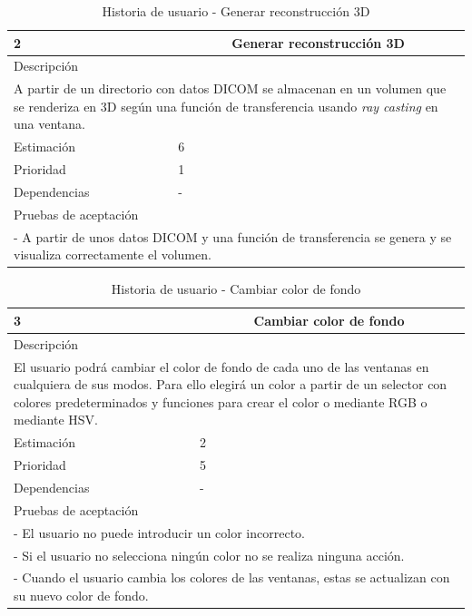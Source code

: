 \begin{table}[H]
	\begin{center}
		\begin{tabular} {|l|c|l|}
			\hline
			2 & \multicolumn{2}{c|}{Generar reconstrucción 3D} \\ \hline \hline
			\multicolumn{3}{|l|}{Descripción} \\ \hline
			\multicolumn{3}{|p{12cm}|}{A partir de un directorio con datos DICOM se almacenan en un volumen que se renderiza en 3D  según una función de transferencia usando \textit{ray casting} en una ventana.} \\ \hline
			\multicolumn{2}{|l|}{Estimación} & 6 \\ \hline
			\multicolumn{2}{|l|}{Prioridad} & 1 \\ \hline
			\multicolumn{2}{|l|}{Dependencias} & - \\ \hline
			\multicolumn{3}{|l|}{Pruebas de aceptación} \\ \hline
			\multicolumn{3}{|p{12cm}|}{ - A partir de unos datos DICOM y una función de transferencia se genera y se visualiza correctamente el volumen.} \\ \hline
		\end{tabular}
	\end{center}
	\caption{Historia de usuario - Generar reconstrucción 3D}
	\label{tab:hu_generar_reconstruccion_3d}
\end{table}

\begin{table}[H]
	\begin{center}
		\begin{tabular} {|l|c|l|}
			\hline
			3 & \multicolumn{2}{c|}{Cambiar color de fondo} \\ \hline \hline
			\multicolumn{3}{|l|}{Descripción} \\ \hline
			\multicolumn{3}{|p{12cm}|}{El usuario podrá cambiar el color de fondo de cada uno de las ventanas en cualquiera de sus modos. Para ello elegirá un color a partir de un selector con colores predeterminados y funciones para crear el color o mediante RGB o mediante HSV.} \\ \hline
			\multicolumn{2}{|l|}{Estimación} & 2 \\ \hline
			\multicolumn{2}{|l|}{Prioridad} & 5 \\ \hline
			\multicolumn{2}{|l|}{Dependencias} & - \\ \hline
			\multicolumn{3}{|l|}{Pruebas de aceptación} \\ \hline
			\multicolumn{3}{|p{12cm}|}{ - El usuario no puede introducir un color incorrecto.} \\
			\multicolumn{3}{|p{12cm}|}{ - Si el usuario no selecciona ningún color no se realiza ninguna acción.} \\
			\multicolumn{3}{|p{12cm}|}{ - Cuando el usuario cambia los colores de las ventanas, estas se actualizan con su nuevo color de fondo.} \\ \hline
		\end{tabular}
	\end{center}
	\caption{Historia de usuario - Cambiar color de fondo}
	\label{tab:hu_cambiar_color_de_fondo}
\end{table}

